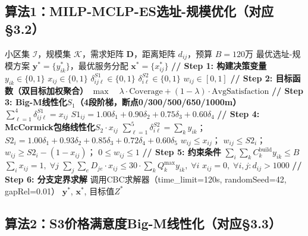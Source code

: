 \documentclass[12pt,a4paper]{ctexart}
\begin{document}
\subsection*{算法1：MILP-MCLP-ES选址-规模优化（对应§3.2）}

\begin{algorithm}[H]
\caption{MILP-MCLP-ES核心算法框架}
\label{alg:mclp_es}
\begin{algorithmic}[1]
\Require 小区集 $\mathcal{I}$，规模集 $\mathcal{K}$，需求矩阵 $\mathbf{D}$，距离矩阵 $d_{ij}$，预算 $B=120$万
\Ensure 最优选址-规模方案 $\mathbf{y}^*=\{y_{ik}^*\}$，最优服务分配 $\mathbf{x}^*=\{x_{ij}^*\}$
\State \textbf{// Step 1: 构建决策变量}
\State $y_{ik} \in \{0,1\}$ 
\State $x_{ij} \in \{0,1\}$ 
\State $\delta_{ij\ell}^{S1}\in\{0,1\}$ 
\State $\delta_{i\ell}^{S2}\in\{0,1\}$ 
\State $w_{ij}\in[0,1]$ 
\State \textbf{// Step 2: 目标函数（双目标加权聚合）}
\State $\max \quad \lambda\cdot\text{Coverage} + (1-\lambda)\cdot\text{AvgSatisfaction}$
\State \textbf{// Step 3: Big-M线性化$S_1$（4段阶梯，断点0/300/500/650/1000m）}
    \State $\sum_{\ell=1}^{4}\delta_{ij\ell}^{S1}=x_{ij}$
    \State $S1_{ij}=1.00\delta_1+0.90\delta_2+0.75\delta_3+0.60\delta_4$
\EndFor
\State \textbf{// Step 4: McCormick包络线性化$S_2\cdot x_{ij}$}
    \State $\sum_{\ell=1}^{5}\delta_{i\ell}^{S2}=\sum_k y_{ik}$； $S2_i=1.00\delta_1+0.93\delta_2+0.85\delta_3+0.72\delta_4+0.60\delta_5$
    \State $w_{ij}\le x_{ij}$； $w_{ij}\le S2_i$； $w_{ij}\ge S2_i-(1-x_{ij})$； $0\le w_{ij}\le 1$
\EndFor
\State \textbf{// Step 5: 约束条件}
\State $\sum_i\sum_k C_k^{\text{build}}y_{ik}\le B$ 
\State $\sum_i x_{ij}=1,\;\forall j$ 
\State $\sum_j\sum_e D_{je}\cdot x_{ij}\le 30\cdot\sum_k Q_k^{\max}y_{ik},\;\forall i$ 
\State $x_{ij}=0,\;\forall i,j: d_{ij}>1000$ 
\State \textbf{// Step 6: 分支定界求解}
\State 调用CBC求解器（time\_limit=120s, randomSeed=42, gapRel=0.01）
\State \Return $\mathbf{y}^*$, $\mathbf{x}^*$, 目标值$Z^*$
\end{algorithmic}
\end{algorithm}

\subsection*{算法2：S3价格满意度Big-M线性化（对应§3.3）}
\end{document}
